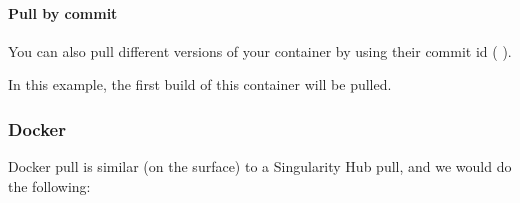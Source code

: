 \documentclass[letterpaper,10pt,english]{sphinxmanual}
\begin{document}
\paragraph{Pull by commit}
\label{\detokenize{appendix:pull-by-commit}}
You can also pull different versions of your container by using their
commit id (  ).

%
\begin{sphinxVerbatim}[commandchars=\\\{\}]
  

  

    
\end{sphinxVerbatim}

In this example, the first build of this container will be pulled.


\subsubsection{Docker}
\label{\detokenize{appendix:id32}}
Docker pull is similar (on the surface) to a Singularity Hub pull, and
we would do the following:
\end{document}
